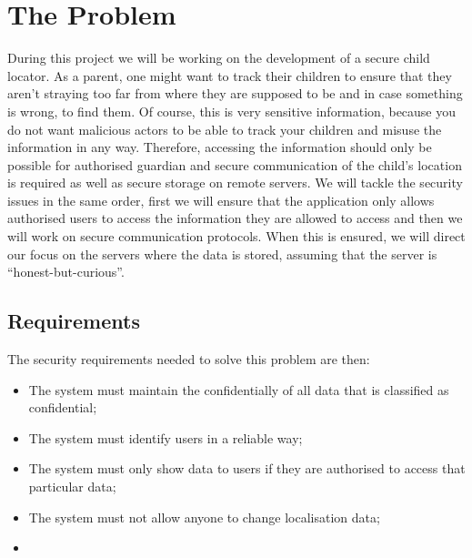 \documentclass[a4paper]{article}
\begin{document}
\tableofcontents

\pagebreak

\section{The Problem}

During this project we will be working on the development of a secure child locator. As a parent,
one might want to track their children to ensure that they aren't straying too far from where they
are supposed to be and in case something is wrong, to find them. Of course, this is very sensitive
information, because you do not want malicious actors to be able to track your children and misuse
the information in any way. Therefore, accessing the information should only be possible for
authorised guardian and secure communication of the child's location is required as well as secure
storage on remote servers. We will tackle the security issues in the same order, first we will
ensure that the application only allows authorised users to access the information they are allowed
to access and then we will work on secure communication protocols. When this is ensured, we will
direct our focus on the servers where the data is stored, assuming that the server is
``honest-but-curious''.

\subsection{Requirements}

The security requirements needed to solve this problem are then:
\begin{itemize}
    \item The system must maintain the confidentially of all data that is classified as confidential;
    \item The system must identify users in a reliable way;
    \item The system must only show data to users if they are authorised to access that particular data;
    \item The system must not allow anyone to change localisation data;
    \item
\end{itemize}

\end{document}
